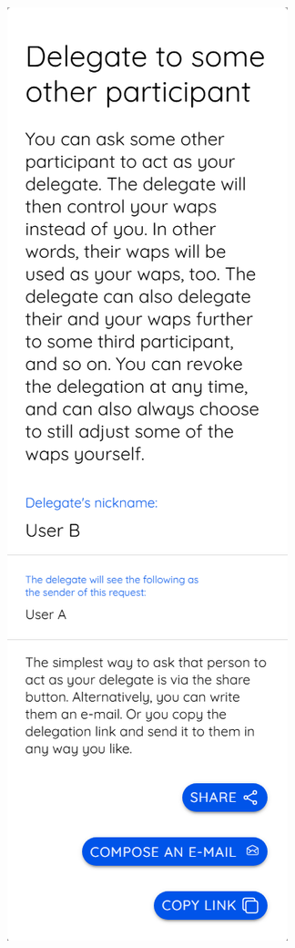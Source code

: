 \begin{figure}[H]
  \centering
  \begin{subfigure}[t]{0.28\linewidth}
    \centering
    \includegraphics[width=\linewidth]{../common/initial_vodle_screenshots/deldialog.png}

\end{subfigure}
\end{figure}
